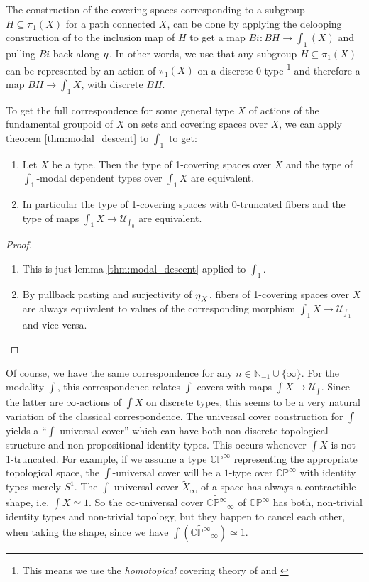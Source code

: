 \documentclass[9pt,twosided]{amsart}
\newcommand{\shape}{\int}
\newcommand{\bC}{\mathbb C}
\newcommand{\bN}{\mathbb N}
\newcommand{\bP}{\mathbb P}
\begin{document}
The construction of the covering spaces corresponding to a subgroup $H\subseteq \pi_1(X)$ for a path connected $X$,
can be done by applying the delooping construction of \cite{LicataFinster} to the inclusion map of $H$ to get a map $Bi:BH\to\shape_1(X)$ and pulling $Bi$ back along ${\eta_{}}$. In other words, we use that any subgroup $H\subseteq\pi_1(X)$ can be represented by an action of $\pi_1(X)$ on a discrete 0-type
\footnote{This means we use the \emph{homotopical} covering theory of \cite[Section 3.1]{favonia-thesis} 
and \cite[Section 7.1]{ulrik-egbert-floris-groups}}
and therefore a map $BH\to \shape_1X$, with discrete $BH$.

To get the full correspondence for some general type $X$ of actions of the fundamental groupoid of $X$ on sets and covering spaces over $X$,
we can apply theorem \ref{thm:modal_descent} to $\shape_1$ to get:

\begin{thm}
  \begin{enumerate}
  \item Let $X$ be a type. Then the type of 1-covering spaces over $X$ and the type of $\shape_1$-modal dependent types over $\shape_1 X$ are equivalent.
  \item In particular the type of 1-covering spaces with 0-truncated fibers and the type of maps $\shape_1X\to \mathcal U_{\shape_0}$ are equivalent.
  \end{enumerate}
\end{thm}
\begin{proof}
  \begin{enumerate}
  \item This is just lemma \ref{thm:modal_descent} applied to $\shape_1$.
  \item By pullback pasting and surjectivity of ${\eta_{}}_X$, fibers of 1-covering spaces over $X$ are always equivalent to values of the corresponding morphism $\shape_1 X\to \mathcal U_{\shape_1}$ and vice versa.
  \end{enumerate}
\end{proof}

Of course, we have the same correspondence for any $n\in\bN_{-1}\cup\{\infty\}$.
For the modality $\shape$, this correspondence relates $\shape$-covers with 
maps $\shape X\to\mathcal U_{\shape}$.
Since the latter are $\infty$-actions of $\shape X$ on discrete types, this seems to be a very natural variation of the classical correspondence.
The universal cover construction for $\shape$ yields a ``$\shape$-universal cover'' 
which can have both non-discrete topological structure and
non-propositional identity types.
This occurs whenever $\shape X$ is not 1-truncated.
For example, if we assume a type $\bC\bP^\infty$ representing the appropriate topological space,
the $\shape$-universal cover will be a $1$-type over $\bC\bP^\infty$ with identity types merely $S^1$.
The $\shape$-universal cover $\widetilde{X}_\infty$ of a space has always a contractible shape, i.e. $\shape X \simeq 1$.
So the $\infty$-universal cover $\widetilde{\bC\bP^\infty}_\infty$ of $\bC\bP^\infty$ has both, non-trivial identity types and non-trivial topology, but they happen to cancel each other, when taking the shape, since we have $\shape(\widetilde{\bC\bP^\infty}_\infty)\simeq 1$.
\end{document}
